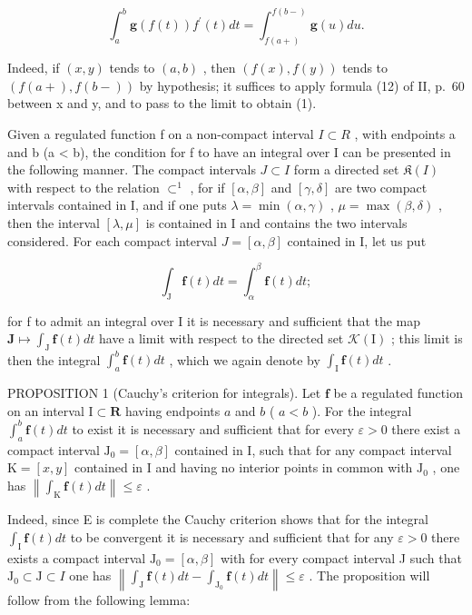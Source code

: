 \[
\int_ {a} ^ {b} \mathbf {g} (f (t)) f ^ {\prime} (t) d t = \int_ {f (a +)} ^ {f (b -)} \mathbf {g} (u) d u.\tag{1}
\]

Indeed, if \((x, y)\) tends to \((a, b)\) , then \((f(x), f(y))\) tends to \((f(a+), f(b-))\) by hypothesis; it suffices to apply formula (12) of II, p.~60 between x and y, and to pass to the limit to obtain (1).

Given a regulated function f on a non-compact interval \(I \subset R\) , with endpoints a and b (a \textless{} b), the condition for f to have an integral over I can be presented in the following manner. The compact intervals \(J \subset I\) form a directed set \(\mathfrak{K}(I)\) with respect to the relation \(\subset^{1}\) , for if \([\alpha, \beta]\) and \([\gamma, \delta]\) are two compact intervals contained in I, and if one puts \(\lambda = \min(\alpha, \gamma)\) , \(\mu = \max(\beta, \delta)\) , then the interval \([\lambda, \mu]\) is contained in I and contains the two intervals considered. For each compact interval \(J = [\alpha, \beta]\) contained in I, let us put

\[
\int_ {\mathrm{J}} \mathbf {f} (t) d t = \int_ {\alpha} ^ {\beta} \mathbf {f} (t) d t;
\]

for f to admit an integral over I it is necessary and sufficient that the map \(\mathbf{J} \mapsto \int_{\mathrm{J}} \mathbf{f}(t) dt\) have a limit with respect to the directed set \(\mathcal{K}(\mathrm{I})\) ; this limit is then the integral \(\int_{a}^{b} \mathbf{f}(t) dt\) , which we again denote by \(\int_{\mathrm{I}} \mathbf{f}(t) dt\) .

PROPOSITION 1 (Cauchy's criterion for integrals). Let \(\mathbf{f}\) be a regulated function on an interval \(\mathrm{I} \subset \mathbf{R}\) having endpoints \(a\) and \(b\) ( \(a < b\) ). For the integral \(\int_{a}^{b} \mathbf{f}(t) dt\) to exist it is necessary and sufficient that for every \(\varepsilon > 0\) there exist a compact interval \(\mathrm{J}_0 = [\alpha, \beta]\) contained in I, such that for any compact interval \(\mathrm{K} = [x, y]\) contained in I and having no interior points in common with \(\mathrm{J}_0\) , one has \(\left\| \int_{\mathrm{K}} \mathbf{f}(t) dt \right\| \leqslant \varepsilon\) .

Indeed, since E is complete the Cauchy criterion shows that for the integral \(\int_{\mathrm{I}} \mathbf{f}(t) dt\) to be convergent it is necessary and sufficient that for any \(\varepsilon > 0\) there exists a compact interval \(\mathrm{J}_0 = [\alpha, \beta]\) with for every compact interval J such that \(\mathrm{J}_0 \subset \mathrm{J} \subset I\) one has \(\left\| \int_{\mathrm{J}} \mathbf{f}(t) dt - \int_{\mathrm{J}_0} \mathbf{f}(t) dt \right\| \leqslant \varepsilon\) . The proposition will follow from the following lemma:

